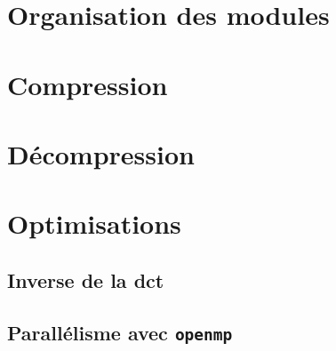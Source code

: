 \documentclass[a4paper, 11pt]{article}
\begin{document}
	\section{Organisation des modules}
	\section{Compression}
	\section{Décompression}
	\section{Optimisations}
	\subsection{Inverse de la dct}
	\subsection{Parallélisme avec \texttt{openmp}}
\end{document}
